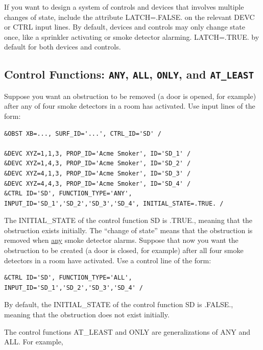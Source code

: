 \documentclass[11pt]{book}
\begin{document}
If you want to design a system of controls and devices that involves multiple changes of state, include the attribute {\ct LATCH=.FALSE.} on the
relevant {\ct DEVC} or {\ct CTRL} input lines. By default, devices and controls may only change state once, like a sprinkler activating or
smoke detector alarming. {\ct LATCH=.TRUE.} by default for both devices and controls.



\subsection{Control Functions: \texorpdfstring{{\tt ANY}}{ANY}, \texorpdfstring{{\tt ALL}}{ALL}, \texorpdfstring{{\tt ONLY}}{ONLY}, and
\texorpdfstring{{\tt AT\_LEAST}}{AT_LEAST} }

Suppose you want an obstruction to be removed (a door is opened, for example) after any of four smoke detectors in a room has activated. Use input lines of the
form:

\footnotesize
\begin{verbatim}
&OBST XB=..., SURF_ID='...', CTRL_ID='SD' /

&DEVC XYZ=1,1,3, PROP_ID='Acme Smoker', ID='SD_1' /
&DEVC XYZ=1,4,3, PROP_ID='Acme Smoker', ID='SD_2' /
&DEVC XYZ=4,1,3, PROP_ID='Acme Smoker', ID='SD_3' /
&DEVC XYZ=4,4,3, PROP_ID='Acme Smoker', ID='SD_4' /
&CTRL ID='SD', FUNCTION_TYPE='ANY', INPUT_ID='SD_1','SD_2','SD_3','SD_4', INITIAL_STATE=.TRUE. /
\end{verbatim}
\normalsize

\noindent
The {\ct INITIAL\_STATE} of the control function {\ct SD} is {\ct .TRUE.}, meaning that the obstruction exists
initially. The ``change of state'' means that the obstruction is removed when \underline{any} smoke detector alarms.
Suppose that now you want the obstruction to be created (a door is closed, for example) after all four smoke detectors in a room have activated. Use a control line
of the form:

\footnotesize
\begin{verbatim}
&CTRL ID='SD', FUNCTION_TYPE='ALL', INPUT_ID='SD_1','SD_2','SD_3','SD_4' /
\end{verbatim}
\normalsize

\noindent
By default, the {\ct INITIAL\_STATE} of the control function {\ct SD} is {\ct .FALSE.}, meaning that the obstruction does not exist
initially.

The control functions {\ct AT\_LEAST} and {\ct ONLY} are generalizations of {\ct ANY} and {\ct ALL}. For example,
\end{document}
